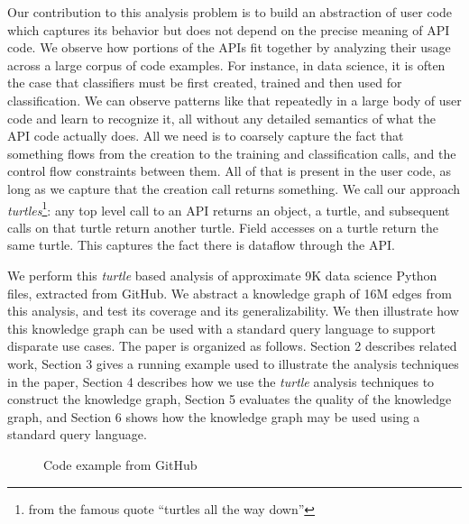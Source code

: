 Our contribution to this analysis problem is to build an abstraction of user code which captures its behavior but does not depend on the precise meaning of API code.  We observe how portions of the APIs fit together by analyzing their usage across a large corpus of code examples.  For instance, in data science, it is often the case that classifiers must be first created, trained and then used for classification.  We can observe patterns like that repeatedly in a large body of user code and learn to recognize it, all without any detailed semantics of what the API code actually does.  All we need is to coarsely capture the fact that something flows from the creation to the training and classification calls, and the control flow constraints between them.  All of that is present in the user code, as long as we capture that the creation call returns something.  We call our approach \textit{turtles}\footnote{from the famous quote ``turtles all the way down''}: any top level call to an API returns an object, a turtle, and subsequent calls on that turtle return another turtle.  Field accesses on a turtle return the same turtle.  This captures the fact there is dataflow through the API.
 
We perform this \textit{turtle} based analysis of approximate 9K data science Python files, extracted from GitHub.  We abstract a knowledge graph of 16M edges from this analysis, and test its coverage and its generalizability.  We then illustrate how this knowledge graph can be used with a standard query language to support disparate use cases.  The paper is organized as follows.  Section 2 describes related work, Section 3 gives a running example used to illustrate the analysis techniques in the paper, Section 4 describes how we use the \textit{turtle} analysis techniques to construct the knowledge graph, Section 5 evaluates the quality of the knowledge graph, and Section 6 shows how the knowledge graph may be used using a standard query language.

\begin{figure*}[htb]
\centering 
{\renewcommand\thelstnumber{%
\ifnum\value{lstnumber}>29\relax \the\numexpr 
278+\value{lstnumber}\relax\else 
\ifnum\value{lstnumber}>25\relax \the\numexpr 
139+\value{lstnumber}\relax\else 
\ifnum\value{lstnumber}>22\relax \the\numexpr 
132+\value{lstnumber}\relax\else 
\ifnum\value{lstnumber}>20\relax \the\numexpr 
130+\value{lstnumber}\relax\else 
\ifnum\value{lstnumber}>7\relax \the\numexpr 
92+\value{lstnumber}\relax\else 
\the\numexpr 
6+\value{lstnumber}\fi\fi\fi\fi\fi}
}
\caption{Code example from GitHub}
\label{running_example}
\end{figure*}
